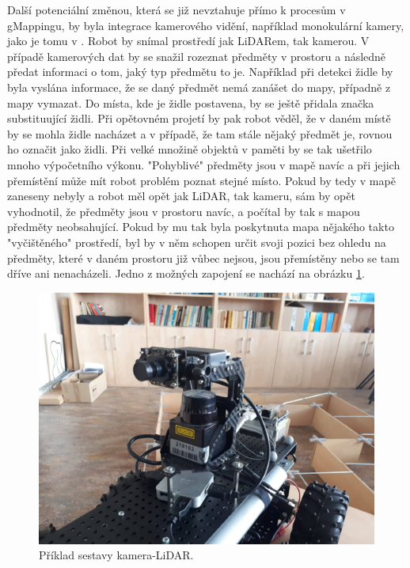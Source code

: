 \documentclass[12pt]{report}
\begin{document}
\indent Další potenciální změnou, která se již nevztahuje přímo k procesům v gMappingu, by byla integrace kamerového vidění, například monokulární kamery, jako je tomu v \cite{Galvez-Lopez2016}. Robot by snímal prostředí jak LiDARem, tak kamerou. V případě kamerových dat by se snažil rozeznat předměty v prostoru a následně předat informaci o tom, jaký typ předmětu to je. Například při detekci židle by byla vyslána informace, že se daný předmět nemá zanášet do mapy, případně z mapy vymazat. Do místa, kde je židle postavena, by se ještě přidala značka substituující židli. Při opětovném projetí by pak robot věděl, že v daném místě by se mohla židle nacházet a v případě, že tam stále nějaký předmět je, rovnou ho označit jako židli. Při velké množině objektů v paměti by se tak ušetřilo mnoho výpočetního výkonu. "Pohyblivé" předměty jsou v mapě navíc a při jejich přemístění může mít robot problém poznat stejné místo. Pokud by tedy v mapě zaneseny nebyly a robot měl opět jak LiDAR, tak kameru, sám by opět vyhodnotil, že předměty jsou v prostoru navíc, a počítal by tak s mapou předměty neobsahující. Pokud by mu tak byla poskytnuta mapa nějakého takto "vyčištěného" prostředí, byl by v něm schopen určit svoji pozici bez ohledu na předměty, které v daném prostoru již vůbec nejsou, jsou přemístěny nebo se tam dříve ani nenacházeli. Jedno z možných zapojení se nachází na obrázku \ref{fig:camera}.

\begin{figure}[t]
	\begin{center}
		\includegraphics[width=0.7\columnwidth]{imgs/camera.jpg}
	\end{center}
	\caption{Příklad sestavy kamera-LiDAR.}
	\label{fig:camera}
\end{figure}


\newpage
\end{document}

